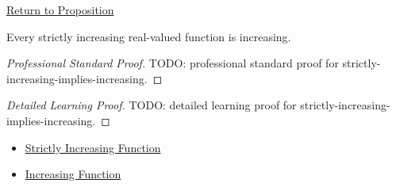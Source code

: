 \newpage
{}
\label{prf:strictly-increasing-implies-increasing}

\begin{remark*}[Return]
\hyperref[prop:strictly-increasing-implies-increasing]{Return to Proposition}
\end{remark*}

\begin{proposition*}
Every strictly increasing real-valued function is increasing.
\end{proposition*}

\begin{proof}[Professional Standard Proof]
\LRAProofBodyStart
TODO: professional standard proof for strictly-increasing-implies-increasing.
\end{proof}

\begin{proof}[Detailed Learning Proof]
\LRAProofBodyStart
TODO: detailed learning proof for strictly-increasing-implies-increasing.
\end{proof}

\begin{remark*}
\end{remark*}

\begin{dependencies}
\begin{itemize}
  \item \hyperref[def:function-strictly-increasing]{Strictly Increasing Function}
  \item \hyperref[def:function-increasing]{Increasing Function}
\end{itemize}
\end{dependencies}

\clearpage
